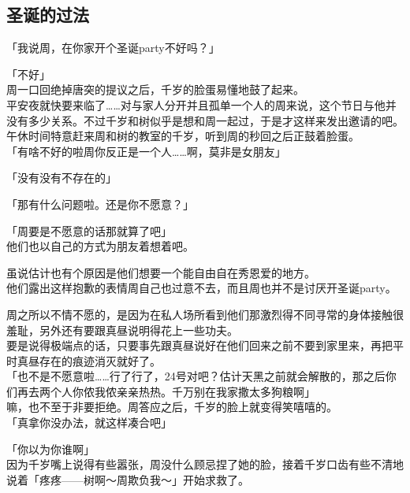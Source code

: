 \subsection{圣诞的过法}

「我说周，在你家开个圣诞party不好吗？」

「不好」\\

周一口回绝掉唐突的提议之后，千岁的脸蛋易懂地鼓了起来。\\

平安夜就快要来临了……对与家人分开并且孤单一个人的周来说，这个节日与他并没有多少关系。不过千岁和树似乎是想和周一起过，于是才这样来发出邀请的吧。\\

午休时间特意赶来周和树的教室的千岁，听到周的秒回之后正鼓着脸蛋。\\

「有啥不好的啦周你反正是一个人……啊，莫非是女朋友」

「没有没有不存在的」

「那有什么问题啦。还是你不愿意？」

「周要是不愿意的话那就算了吧」\\

他们也以自己的方式为朋友着想着吧。

虽说估计也有个原因是他们想要一个能自由自在秀恩爱的地方。\\

他们露出这样抱歉的表情周自己也过意不去，而且周也并不是讨厌开圣诞party。

周之所以不情不愿的，是因为在私人场所看到他们那激烈得不同寻常的身体接触很羞耻，另外还有要跟真昼说明得花上一些功夫。\\

要是说得极端点的话，只要事先跟真昼说好在他们回来之前不要到家里来，再把平时真昼存在的痕迹消灭就好了。\\

「也不是不愿意啦……行了行了，24号对吧？估计天黑之前就会解散的，那之后你们再去两个人你侬我侬亲亲热热。千万别在我家撒太多狗粮啊」\\

嘛，也不至于非要拒绝。周答应之后，千岁的脸上就变得笑嘻嘻的。\\

「真拿你没办法，就这样凑合吧」

「你以为你谁啊」\\

因为千岁嘴上说得有些嚣张，周没什么顾忌捏了她的脸，接着千岁口齿有些不清地说着「疼疼——树啊～周欺负我～」开始求救了。\\

